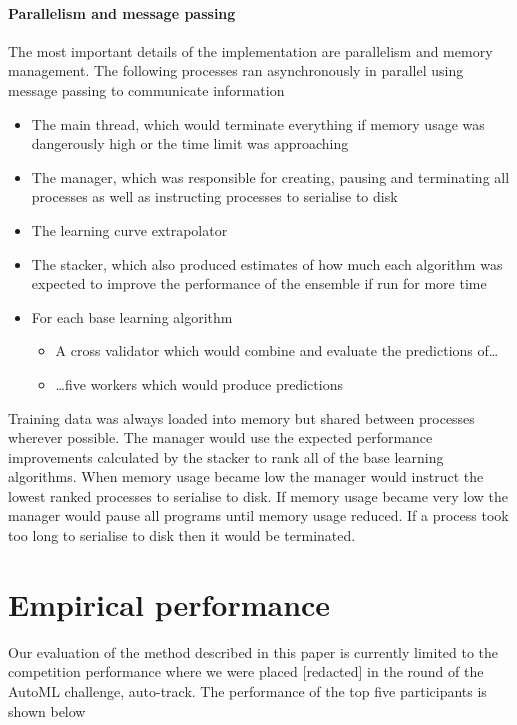 \documentclass{article} %
\begin{document}
\paragraph{Parallelism and message passing}

The most important details of the implementation are parallelism and memory management.
The following processes ran asynchronously in parallel using message passing to communicate information
\begin{itemize}
  \item The main thread, which would terminate everything if memory usage was dangerously high or the time limit was approaching
  \item The manager, which was responsible for creating, pausing and terminating all processes as well as instructing processes to serialise to disk
  \item The learning curve extrapolator
  \item The stacker, which also produced estimates of how much each algorithm was expected to improve the performance of the ensemble if run for more time
  \item For each base learning algorithm
  \begin{itemize}
    \item A cross validator which would combine and evaluate the predictions of\dots
    \item \dots five workers which would produce predictions
  \end{itemize}
\end{itemize}

Training data was always loaded into memory but shared between processes wherever possible.
The manager would use the expected performance improvements calculated by the stacker to rank all of the base learning algorithms.
When memory usage became low the manager would instruct the lowest ranked processes to serialise to disk.
If memory usage became very low the manager would pause all programs until memory usage reduced.
If a process took too long to serialise to disk then it would be terminated.

\section{Empirical performance}

Our evaluation of the method described in this paper is currently limited to the competition performance where we were placed [redacted] in the  round of the AutoML challenge, auto-track.
The performance of the top five participants is shown below
\end{document}
